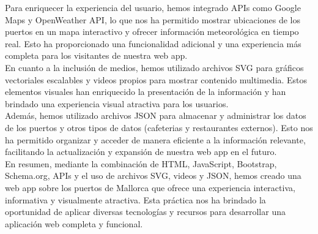 \documentclass{article}
\begin{document}
\noindent Para enriquecer la experiencia del usuario, hemos integrado APIs como Google Maps y OpenWeather API, lo que nos ha permitido mostrar ubicaciones de los puertos en un mapa interactivo y ofrecer información meteorológica en tiempo real. Esto ha proporcionado una funcionalidad adicional y una experiencia más completa para los visitantes de nuestra web app.\\

\noindent En cuanto a la inclusión de medios, hemos utilizado archivos SVG para gráficos vectoriales escalables y videos propios para mostrar contenido multimedia. Estos elementos visuales han enriquecido la presentación de la información y han brindado una experiencia visual atractiva para los usuarios.\\

\noindent Además, hemos utilizado archivos JSON para almacenar y administrar los datos de los puertos y otros tipos de datos (cafeterias y restaurantes externos). Esto nos ha permitido organizar y acceder de manera eficiente a la información relevante, facilitando la actualización y expansión de nuestra web app en el futuro.\\

\noindent En resumen, mediante la combinación de HTML, JavaScript, Bootstrap, Schema.org, APIs y el uso de archivos SVG, videos y JSON, hemos creado una web app sobre los puertos de Mallorca que ofrece una experiencia interactiva, informativa y visualmente atractiva. Esta práctica nos ha brindado la oportunidad de aplicar diversas tecnologías y recursos para desarrollar una aplicación web completa y funcional.
\end{document}
